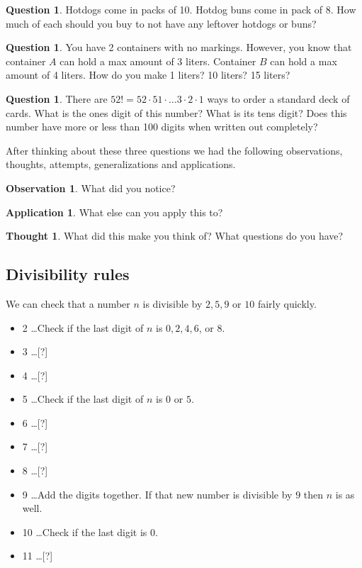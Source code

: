 \documentclass[11pt]{article}
\theoremstyle{definition}
\newtheorem{question}[thm]{Question}
\newtheorem{observation}{Observation}
\newtheorem{thought}{Thought}
\newtheorem{application}{Application}
\numberwithin{thm}{section}
\begin{document}
\begin{question} Hotdogs come in packs of 10. Hotdog buns come in pack of 8. How much of each should you buy to not have any leftover hotdogs or buns?
\end{question}

\begin{question} You have 2 containers with no markings. However, you know that container $A$ can hold a max amount of 3 liters. Container $B$ can hold a max amount of 4 liters. How do you make 1 liters? 10 liters? 15 liters?
\end{question}

\begin{question} There are $52! = 52 \cdot 51 \cdot \ldots 3 \cdot 2 \cdot 1$ ways to order a standard deck of cards. What is the ones digit of this number? What is its tens digit? Does this number have more or less than 100 digits when written out completely?
\end{question}

After thinking about these three questions we had the following observations, thoughts, attempts, generalizations and applications.

\begin{observation} What did you notice?
\end{observation}

\begin{application} What else can you apply this to?
\end{application}

\begin{thought} What did this make you think of? What questions do you have?
\end{thought}

\subsection{Divisibility rules}

We can check that a number $n$ is divisible by $2,5,9$ or $10$ fairly quickly. 

\begin{itemize}
	\item 2 \ldots Check if the last digit of $n$ is $0,2,4,6$, or $8$.
    \item 3 \ldots [?]
    \item 4 \ldots [?]
    \item 5 \ldots Check if the last digit of $n$ is $0$ or $5$.
    \item 6 \ldots [?]
    \item 7 \ldots [?]
    \item 8 \ldots [?]
    \item 9 \ldots Add the digits together. If that new number is divisible by $9$ then $n$ is as well.
    \item 10 \ldots Check if the last digit is $0$.
    \item 11 \ldots [?]
\end{itemize}
\end{document}
